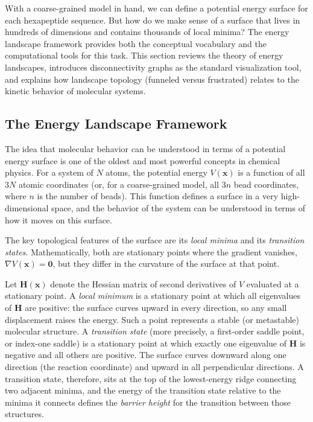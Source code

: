 With a coarse-grained model in hand, we can define a potential energy surface for each hexapeptide sequence. But how do we make sense of a surface that lives in hundreds of dimensions and contains thousands of local minima? The energy landscape framework provides both the conceptual vocabulary and the computational tools for this task. This section reviews the theory of energy landscapes, introduces disconnectivity graphs as the standard visualization tool, and explains how landscape topology (funneled versus frustrated) relates to the kinetic behavior of molecular systems.

\subsection{The Energy Landscape Framework}

The idea that molecular behavior can be understood in terms of a potential
energy surface is one of the oldest and most powerful concepts in chemical
physics. For a system of $N$ atoms, the potential energy $V(\mathbf{x})$ is a
function of all $3N$ atomic coordinates (or, for a coarse-grained model, all
$3n$ bead coordinates, where $n$ is the number of beads). This function defines
a surface in a very high-dimensional space, and the behavior of the system can
be understood in terms of how it moves on this surface.

The key topological features of the surface are its \emph{local minima} and
its \emph{transition states}. Mathematically, both are stationary points where
the gradient vanishes, $\nabla V(\mathbf{x}) = \mathbf{0}$, but they differ in
the curvature of the surface at that point.

Let $\mathbf{H}(\mathbf{x})$
denote the Hessian matrix of second derivatives of $V$ evaluated at a
stationary point. A \emph{local minimum} is a stationary point at which all
eigenvalues of $\mathbf{H}$ are positive: the surface curves upward in every
direction, so any small displacement raises the energy. Such a point represents
a stable (or metastable) molecular structure. A \emph{transition state} (more
precisely, a first-order saddle point, or index-one saddle) is a stationary
point at which exactly one eigenvalue of $\mathbf{H}$ is negative and all
others are positive. The surface curves downward along one direction (the
reaction coordinate) and upward in all perpendicular directions. A transition
state, therefore, sits at the top of the lowest-energy ridge connecting two
adjacent minima, and the energy of the transition state relative to the minima
it connects defines the \emph{barrier height} for the transition between those
structures.

